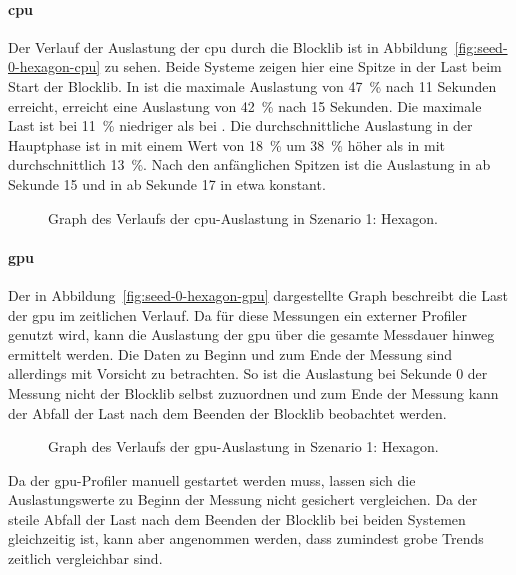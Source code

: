 \paragraph{\ac{cpu}} Der Verlauf der Auslastung der \ac{cpu} durch die Blocklib ist in Abbildung~\vref{fig:seed-0-hexagon-cpu} zu sehen. Beide Systeme zeigen hier eine Spitze in der Last beim Start der Blocklib. In \sysA{} ist die maximale Auslastung von \SI{47}{\percent} nach 11 Sekunden erreicht, \sysB{} erreicht eine Auslastung von \SI{42}{\percent} nach 15 Sekunden. Die maximale Last ist bei \sysB{} \SI{11}{\percent} niedriger als bei \sysA{}. Die durchschnittliche Auslastung in der Hauptphase ist in \sysB{} mit einem Wert von \SI{18}{\percent} um \SI{38}{\percent} höher als in \sysB{} mit durchschnittlich \SI{13}{\percent}. Nach den anfänglichen Spitzen ist die Auslastung in \sysA{} ab Sekunde 15 und in \sysB{} ab Sekunde 17 in etwa konstant.
\begin{figure}[!htbp]
	\caption[Graph des Verlaufs der -Auslastung in Szenario 1: Hexagon.]{Graph des Verlaufs der \ac{cpu}-Auslastung in Szenario 1: Hexagon.}\label{fig:seed-0-hexagon-cpu}
\end{figure}


\paragraph{\ac{gpu}} Der in Abbildung~\vref{fig:seed-0-hexagon-gpu} dargestellte Graph beschreibt die Last der \ac{gpu} im zeitlichen Verlauf. Da für diese Messungen ein externer Profiler genutzt wird, kann die Auslastung der \ac{gpu} über die gesamte Messdauer hinweg ermittelt werden. Die Daten zu Beginn und zum Ende der Messung sind allerdings mit Vorsicht zu betrachten. So ist die Auslastung bei Sekunde $0$ der Messung nicht der Blocklib selbst zuzuordnen und zum Ende der Messung kann der Abfall der Last nach dem Beenden der Blocklib beobachtet werden. 
\begin{figure}[!htbp]
	\caption[Graph des Verlaufs der -Auslastung in Szenario 1: Hexagon.]{Graph des Verlaufs der \ac{gpu}-Auslastung in Szenario 1: Hexagon.}\label{fig:seed-0-hexagon-gpu}
\end{figure}

Da der \ac{gpu}-Profiler manuell gestartet werden muss, lassen sich die Auslastungswerte zu Beginn der Messung nicht gesichert vergleichen. Da der steile Abfall der Last nach dem Beenden der Blocklib bei beiden Systemen gleichzeitig ist, kann aber angenommen werden, dass zumindest grobe Trends zeitlich vergleichbar sind.

